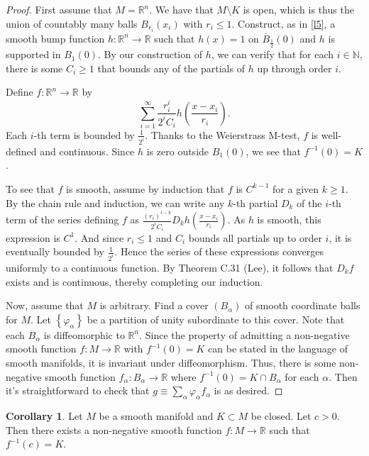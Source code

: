 \documentclass[10pt,letterpaper,cm]{nupset}
\theoremstyle{definition}
\theoremstyle{theorem}
\newtheorem{corollary}[definition]{Corollary}
\theoremstyle{remark}
\newcommand{\N}{\mathbb N}
\newcommand{\R}{\mathbb R}
\newcommand{\1}{\mathbf{1}}
\newcommand{\0}{\vec 0}
\begin{document}
\begin{proof}
First assume that $M=\R^n$. We have that $M\setminus K$ is open, which is thus the union of countably many balls $B_{r_i}(x_i)$ with $r_i \leq 1$. Construct, as in \cref{l5}, a smooth bump function $h: \R^n \to \R$ such that
 $h(x) =1$ on $\bar{B}_{\frac{1}{2}}(0)$ and  $h$ is supported in $B_1(0)$.  By our construction of $h$, we can verify that for each $i\in \N$, there is some $C_i \geq 1$ that bounds any of the partials of $h$ up through order $i$. 

 Define $f: \R^n \to \R$ by $$\sum_{i=1}^\infty \frac{r_i^i}{2^iC_i}h \left(\frac{x-x_i}{r_i}\right).$$ Each $i$-th term is bounded by $\frac{1}{2^i}$. Thanks to the Weierstrass M-test, $f$ is well-defined and continuous. Since $h$ is zero outside $B_1(0)$, we see that $f^{-1}(0) = K$. 
 
 To see that $f$ is smooth, assume by induction that $f$ is $C^{k-1}$ for a given $k \geq 1$. By the chain rule and induction, we can write any $k$-th partial $D_k$ of the $i$-th term of the series defining $f$ as $\frac{(r_i)^{i-k}}{2^iC_i} D_kh(\frac{x-x_i}{r_i})$. As $h$ is smooth, this expression is $C^1$. And since $r_i \leq 1$ and $C_i$ bounds all partials up to order $i$, it is eventually bounded by $\frac{1}{2^i}$. Hence the series of these expressions converges uniformly to a continuous function. By Theorem C.31 (Lee), it follows that $D_kf$ exists and is continuous, thereby completing our induction. 

 Now, assume that $M$ is arbitrary. Find a cover $\left(B_\alpha\right)$ of smooth coordinate balls for $M$. Let $\left\{\varphi_\alpha\right\}$ be a partition of unity subordinate to this cover. Note that each $B_\alpha$ is diffeomorphic to $\R^n$. Since the property of admitting a non-negative smooth function $f: M \to \R$ with $f^{-1}(0) = K$ can be stated in the language of smooth manifolds, it is invariant under diffeomorphism. Thus, there is some non-negative smooth function $f_\alpha : B_\alpha \to \R$ where $f^{-1}(0) = K \cap B_\alpha$ for each $\alpha$. Then it's straightforward to check that $g \equiv \sum_{\alpha} \varphi_\alpha f_\alpha$ is as desired.
\end{proof}

\begin{corollary}
Let $M$ be a smooth manifold and $K \subset M$ be closed. Let $c >0$. Then there exists a non-negative smooth function $f: M \to \R$ such that $f^{-1}(c) =K$.
\end{corollary}
\end{document}
